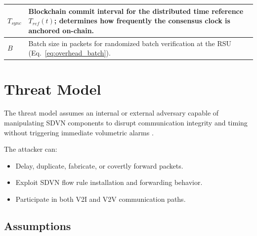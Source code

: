 \documentclass[12pt, a4paper]{report}
\begin{document}
\begin{table}[H]
\begin{center}
\begin{tabular}{| m{2.50cm} | m{8.5cm} |}
                        \hline
                        $T_{sync}$ &
                        Blockchain commit interval for
                        the distributed time reference
                        $T_{ref}(t)$; determines how
                        frequently the consensus clock
                        is anchored on-chain. \\
                        \hline
                        $B$ &
                        Batch size in packets for
                        randomized batch verification
                        at the \ac{RSU}
                        (Eq.~\ref{eq:overhead_batch}).\\

                        \hline
                \end{tabular}
        \end{center}
        \vspace{-10pt}
\end{table}
\section{Threat Model}
The threat model assumes an internal or external adversary capable of manipulating SDVN components to disrupt communication integrity and timing without triggering immediate volumetric alarms \cite{PASCOAL2020107223}\cite{DBLP:journals/air/QammarKND23}.

The attacker can:
\begin{itemize}
  \item Delay, duplicate, fabricate, or covertly forward packets.
  \item Exploit SDVN flow rule installation and forwarding behavior.
  \item Participate in both V2I and V2V communication paths\cite{app10093217}.
\end{itemize}

\subsection{Assumptions}
\end{document}
